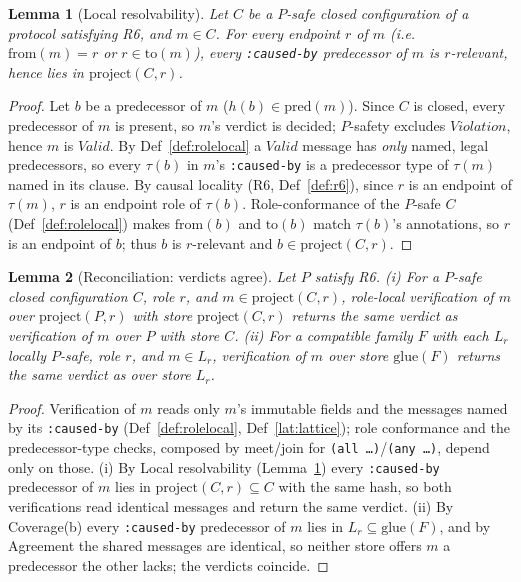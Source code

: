 \documentclass[11pt]{article}
\newcommand{\code}[1]{\texttt{#1}}
\newcommand{\caused}{\code{:caused-by}}
\theoremstyle{definition}
\theoremstyle{plain}
\newtheorem{lemma}{Lemma}
\begin{document}
\begin{lemma}[Local resolvability]
\label{lem:localres}
Let $C$ be a $P$-safe \emph{closed} configuration of a protocol satisfying R6, and $m\in C$.
For every endpoint $r$ of $m$ (i.e.\ $\mathrm{from}(m)=r$ or $r\in\mathrm{to}(m)$), every
\caused{} predecessor of $m$ is $r$-relevant, hence lies in $\mathrm{project}(C,r)$.
\end{lemma}
\begin{proof}
Let $b$ be a predecessor of $m$ ($h(b)\in\mathrm{pred}(m)$).
Since $C$ is closed, every predecessor of $m$ is present, so $m$'s verdict is decided;
$P$-safety excludes $\mathit{Violation}$, hence $m$ is $\mathit{Valid}$.
By Def~\ref{def:rolelocal} a $\mathit{Valid}$ message has \emph{only} named, legal
predecessors, so every $\tau(b)$ in $m$'s \caused{} is a predecessor type of $\tau(m)$
named in its clause.
By causal locality (R6, Def~\ref{def:r6}), since $r$ is an endpoint of $\tau(m)$, $r$ is an
endpoint role of $\tau(b)$.
Role-conformance of the $P$-safe $C$ (Def~\ref{def:rolelocal}) makes $\mathrm{from}(b)$ and
$\mathrm{to}(b)$ match $\tau(b)$'s annotations, so $r$ is an endpoint of $b$; thus $b$ is
$r$-relevant and $b\in\mathrm{project}(C,r)$.
\end{proof}

\begin{lemma}[Reconciliation: verdicts agree]
\label{lem:reconcile}
Let $P$ satisfy R6.
\textup{(i)} For a $P$-safe closed configuration $C$, role $r$, and
$m\in\mathrm{project}(C,r)$, role-local verification of $m$ over $\mathrm{project}(P,r)$ with
store $\mathrm{project}(C,r)$ returns the same verdict as verification of $m$ over $P$ with
store $C$.
\textup{(ii)} For a compatible family $F$ with each $L_r$ locally $P$-safe, role $r$, and
$m\in L_r$, verification of $m$ over store $\mathrm{glue}(F)$ returns the same verdict as
over store $L_r$.
\end{lemma}
\begin{proof}
Verification of $m$ reads only $m$'s immutable fields and the messages named by its
\caused{} (Def~\ref{def:rolelocal}, Def~\ref{lat:lattice}); role conformance and the
predecessor-type checks, composed by meet/join for \code{(all \ldots)}/\code{(any \ldots)},
depend only on those.
\textup{(i)} By Local resolvability (Lemma~\ref{lem:localres}) every \caused{} predecessor
of $m$ lies in $\mathrm{project}(C,r)\subseteq C$ with the same hash, so both verifications
read identical messages and return the same verdict.
\textup{(ii)} By Coverage(b) every \caused{} predecessor of $m$ lies in
$L_r\subseteq\mathrm{glue}(F)$, and by Agreement the shared messages are identical, so
neither store offers $m$ a predecessor the other lacks; the verdicts coincide.
\end{proof}
\end{document}
